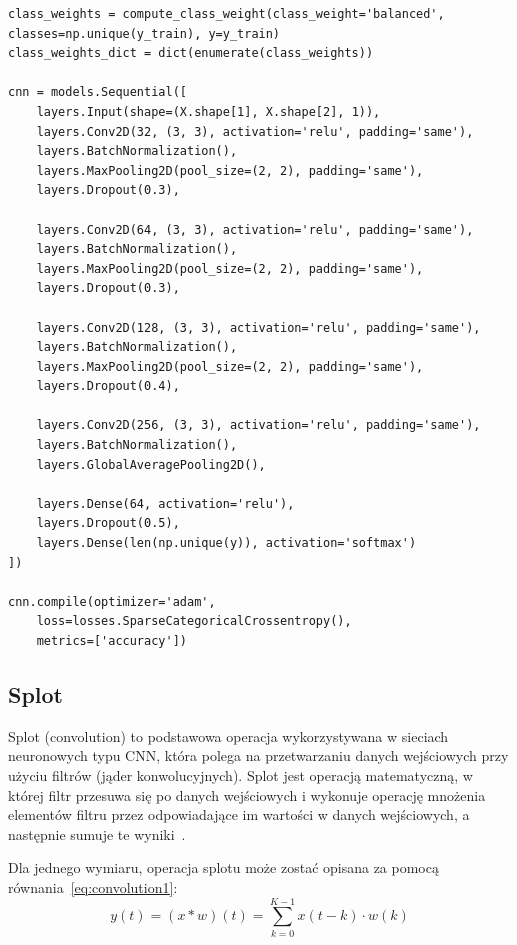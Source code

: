 \documentclass{SGGW-thesis}
\begin{document}
\begin{lstlisting}[caption=Architektura modeli CNN, label={lst:cnn_architecture}, captionpos=b]
class_weights = compute_class_weight(class_weight='balanced', classes=np.unique(y_train), y=y_train)
class_weights_dict = dict(enumerate(class_weights))

cnn = models.Sequential([
    layers.Input(shape=(X.shape[1], X.shape[2], 1)),
    layers.Conv2D(32, (3, 3), activation='relu', padding='same'),
    layers.BatchNormalization(),
    layers.MaxPooling2D(pool_size=(2, 2), padding='same'),
    layers.Dropout(0.3),

    layers.Conv2D(64, (3, 3), activation='relu', padding='same'),
    layers.BatchNormalization(),
    layers.MaxPooling2D(pool_size=(2, 2), padding='same'),
    layers.Dropout(0.3),

    layers.Conv2D(128, (3, 3), activation='relu', padding='same'),
    layers.BatchNormalization(),
    layers.MaxPooling2D(pool_size=(2, 2), padding='same'),
    layers.Dropout(0.4),

    layers.Conv2D(256, (3, 3), activation='relu', padding='same'),
    layers.BatchNormalization(),
    layers.GlobalAveragePooling2D(),

    layers.Dense(64, activation='relu'),
    layers.Dropout(0.5),
    layers.Dense(len(np.unique(y)), activation='softmax')
])

cnn.compile(optimizer='adam',
    loss=losses.SparseCategoricalCrossentropy(),
    metrics=['accuracy'])
\end{lstlisting}

\subsection{Splot}
Splot (convolution) to podstawowa operacja wykorzystywana w sieciach neuronowych typu CNN, która polega na przetwarzaniu danych wejściowych przy użyciu filtrów (jąder konwolucyjnych). Splot jest operacją matematyczną, w której filtr przesuwa się po danych wejściowych i wykonuje operację mnożenia elementów filtru przez odpowiadające im wartości w danych wejściowych, a następnie sumuje te wyniki~\cite{goodfellow2016deep}.

Dla jednego wymiaru, operacja splotu może zostać opisana za pomocą równania~\ref{eq:convolution1}:
\begin{equation}
y(t) = (x * w)(t) = \sum_{k=0}^{K-1} x(t-k) \cdot w(k)
\label{eq:convolution1}
\end{equation}
\end{document}

